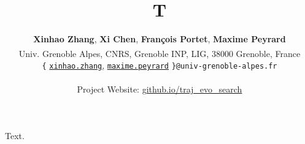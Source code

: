 \documentclass{article}
\title{T}
\author{
\textbf{Xinhao Zhang},
\textbf{Xi Chen},
\textbf{Fran\c{c}ois Portet},
\textbf{Maxime Peyrard}
\\
\textsuperscript{}Univ. Grenoble Alpes, CNRS, Grenoble INP, LIG, 38000 Grenoble, France
\\
\texttt{\{}%
\href{mailto:Xinhao.Zhang@univ-grenoble-alpes.fr}{\color{black}\texttt{{xinhao.zhang}},} %
\href{mailto:maxime.peyrard@univ-grenoble-alpes.fr}{\color{black}\texttt{{maxime.peyrard}}}%
\texttt{\}@univ-grenoble-alpes.fr}
\\
\\
Project Website: \href{https://xinhao-zhang.github.io/traj_evo_search/}{\color{blue}github.io/traj\_evo\_search}}
\begin{document}
\maketitle
Text.
\end{document}
